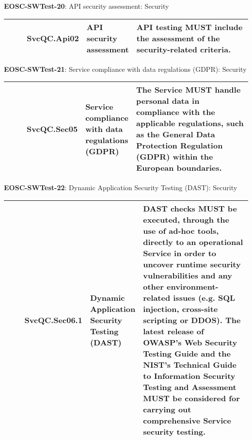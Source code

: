 \textbf{EOSC-SWTest-20}: API security assessment: Security
\nopagebreak[4]
\begin{center}
    \tabletail{\hline}
    \tiny
    \begin{supertabular}{|p{0.10\linewidth}|p{0.10\linewidth}|p{0.20\linewidth}|p{0.60\linewidth}|} \hline
        \cite{orviz_fernandez_eosc-synergy_2020} & SvcQC.Api02 & API security assessment & API testing MUST include the assessment of the security-related criteria.\\ \hline
    \end{supertabular}
\end{center}

\textbf{EOSC-SWTest-21}: Service compliance with data regulations (GDPR): Security
\nopagebreak[4]
\begin{center}
    \tabletail{\hline}
    \tiny
    \begin{supertabular}{|p{0.10\linewidth}|p{0.10\linewidth}|p{0.20\linewidth}|p{0.60\linewidth}|} \hline
        \cite{orviz_fernandez_eosc-synergy_2020} & SvcQC.Sec05 & Service compliance with data regulations (GDPR) & The Service MUST handle personal data in compliance with the applicable regulations, such as the General Data Protection Regulation (GDPR) within the European boundaries.\\ \hline
    \end{supertabular}
\end{center}

\textbf{EOSC-SWTest-22}: Dynamic Application Security Testing (DAST): Security
\nopagebreak[4]
\begin{center}
    \tabletail{\hline}
    \tiny
    \begin{supertabular}{|p{0.10\linewidth}|p{0.10\linewidth}|p{0.20\linewidth}|p{0.60\linewidth}|} \hline
        \cite{orviz_fernandez_eosc-synergy_2020} & SvcQC.Sec06.1 & Dynamic Application Security Testing (DAST) & DAST checks MUST be executed, through the use of ad-hoc tools, directly to an operational Service in order to uncover runtime security vulnerabilities and any other environment-related issues (e.g. SQL injection, cross-site scripting or DDOS). The latest release of OWASP's Web Security Testing Guide and the NIST's Technical Guide to Information Security Testing and Assessment MUST be considered for carrying out comprehensive Service security testing.\\ \hline
    \end{supertabular}
\end{center}


